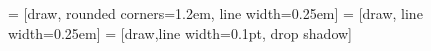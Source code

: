 

 = [draw, rounded corners=1.2em, line width=0.25em]
 = [draw, line width=0.25em]
 = [draw,line width=0.1pt, drop shadow]

\endinput
